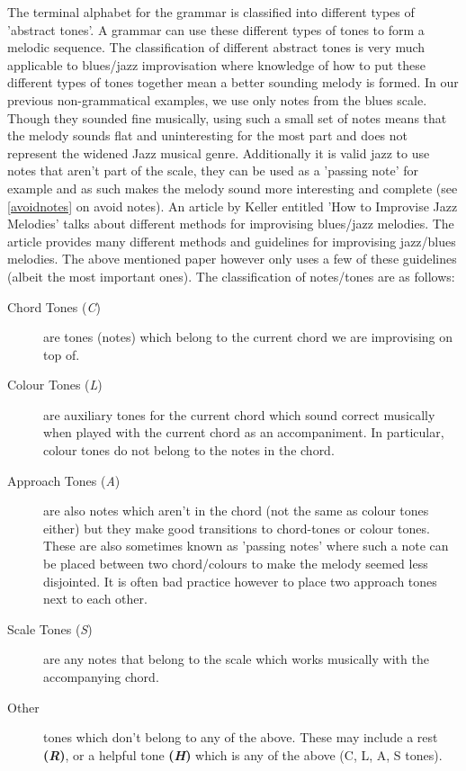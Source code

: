\documentclass[pdftex,12pt,a4paper]{report}
\begin{document}
The terminal alphabet for the grammar is classified into different types of 'abstract tones'. A grammar can use these different types of tones to form a melodic sequence. The classification of different abstract tones is very much applicable to blues/jazz improvisation where knowledge of how to put these different types of tones together mean a better sounding melody is formed. In our previous non-grammatical examples, we use only notes from the blues scale. Though they sounded fine musically, using such a small set of notes means that the melody sounds flat and uninteresting for the most part and does not represent the widened Jazz musical genre. Additionally it is valid jazz to use notes that aren't part of the scale, they can be used as a 'passing note' for example and as such makes the melody sound more interesting and complete (see \ref{avoidnotes} on avoid notes). An article by Keller entitled 'How to Improvise Jazz Melodies' \cite{jazzkeller} talks about different methods for improvising blues/jazz melodies. The article provides many different methods and guidelines for improvising jazz/blues melodies. The above mentioned paper \cite{keller07} however only uses a few of these guidelines (albeit the most important ones). The classification of notes/tones are as follows:

\begin{description}
  \item[Chord Tones (\textit{C})] are tones (notes) which belong to the current chord we are improvising on top of.
  \item[Colour Tones (\textit{L})] are auxiliary tones for the current chord which sound correct musically when played with the current chord as an accompaniment. In particular, colour tones do not belong to the notes in the chord. 
  \item[Approach Tones (\textit{A})] are also notes which aren't in the chord (not the same as colour tones either) but they make good transitions to chord-tones or colour tones. These are also sometimes known as 'passing notes' where such a note can be placed between two chord/colours to make the melody seemed less disjointed. It is often bad practice however to place two approach tones next to each other.
  \item[Scale Tones (\textit{S})] are any notes that belong to the scale which works musically with the accompanying chord.
  \item[Other] tones which don't belong to any of the above. These may include a rest \textbf{(\textit{R})}, or a helpful tone \textbf{(\textit{H})} which is any of the above (C, L, A, S tones).
\end{description}
\end{document}
